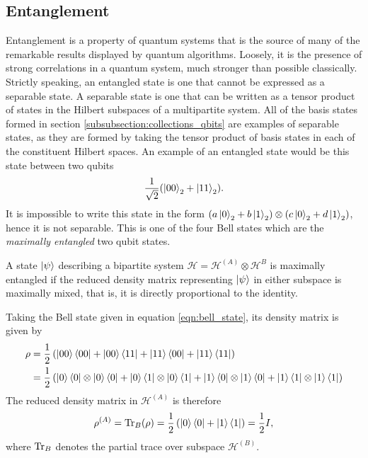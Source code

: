 \subsection{Entanglement}
Entanglement is a property of quantum systems that is the source of many of the remarkable results displayed by quantum algorithms.
Loosely, it is the presence of strong correlations in a quantum system, much stronger than possible classically.
Strictly speaking, an entangled state is one that cannot be expressed as a separable state.
A separable state is one that can be written as a tensor product of states in the Hilbert subspaces of a multipartite system.
All of the basis states formed in section \ref{subsubsection:collections_qbits} are examples of separable states, as they are formed by taking the tensor product of basis states in each of the constituent Hilbert spaces.
An example of an entangled state would be this state between two qubits
\begin{equation}
    \label{eqn:bell_state}
    \frac{1}{\sqrt{2}}(\ket{00}_2 + \ket{11}_2).
\end{equation}
It is impossible to write this state in the form $\left(a\ket{0}_2 + b\ket{1}_2\right) \otimes \left(c\ket{0}_2 + d\ket{1}_2 \right)$, hence it is not separable.
This is one of the four Bell states which are the \emph{maximally entangled} two qubit states.
\begin{definition}
    A state $\ket{\psi}$ describing a bipartite system $\mathcal{H} = \mathcal{H}^{(A)} \otimes \mathcal{H}^{B}$ is maximally entangled if the reduced density matrix representing $\ket{\psi}$ in either subspace is maximally mixed, that is, it is directly proportional to the identity.
\end{definition}
Taking the Bell state given in equation \ref{eqn:bell_state}, its density matrix is given by
\begin{align}
    \rho &= \frac{1}{2}\left(\ket{00}\bra{00} + \ket{00}\bra{11} + \ket{11}\bra{00} + \ket{11}\bra{11}\right)\\
    &= \frac{1}{2}\left(\ket{0}\bra{0}\otimes\ket{0}\bra{0} + \ket{0}\bra{1}\otimes\ket{0}\bra{1} + \ket{1}\bra{0}\otimes\ket{1}\bra{0} + \ket{1}\bra{1}\otimes\ket{1}\bra{1}\right)
\end{align}
The reduced density matrix in $\mathcal{H}^{(A)}$ is therefore
\begin{equation}
    \rho^{(A)} = \operatorname{Tr}_B(\rho) = \frac{1}{2}\left(\ket{0}\bra{0} + \ket{1}\bra{1}\right) = \frac{1}{2}I,
\end{equation}
where $\operatorname{Tr}_B$ denotes the partial trace over subspace $\mathcal{H}^{(B)}$.

